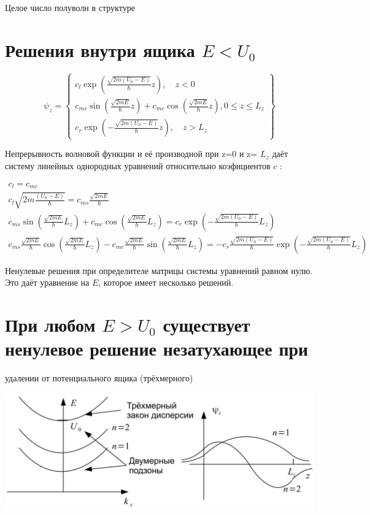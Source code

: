 \documentclass[10pt]{article}
\begin{document}
Целое число полуволн в структуре

\section{Решения внутри ящика $E<U_{0}$}
$$
\psi_{z}=\left\{\begin{array}{c}
c_{l} \exp \left(\frac{\sqrt{2 m\left(U_{0}-E\right)}}{\hbar} z\right), \quad z<0 \\
c_{m s} \sin \left(\frac{\sqrt{2 m E}}{\hbar} z\right)+c_{m c} \cos \left(\frac{\sqrt{2 m E}}{\hbar} z\right), 0 \leq z \leq L_{z} \\
c_{r} \exp \left(-\frac{\sqrt{2 m\left(U_{0}-E\right)}}{\hbar} z\right), \quad z>L_{z}
\end{array}\right\}
$$

Непрерывность волновой функции и её производной при z=0 и z= $L_{z}$ даёт систему линейных однородных уравнений относительно коэфициентов $c$ :

$$
\begin{gathered}
c_{l}=c_{m c} \\
c_{l} \sqrt{2 m \frac{\left(U_{0}-E\right)}{\hbar}}=c_{m s} \frac{\sqrt{2 m E}}{\hbar} \\
c_{m s} \sin \left(\frac{\sqrt{2 m E}}{\hbar} L_{z}\right)+c_{m c} \cos \left(\frac{\sqrt{2 m E}}{\hbar} L_{z}\right)=c_{r} \exp \left(-\frac{\sqrt{2 m\left(U_{0}-E\right)}}{\hbar} L_{z}\right) \\
c_{m s} \frac{\sqrt{2 m E}}{\hbar} \cos \left(\frac{\sqrt{2 m E}}{\hbar} L_{z}\right)-c_{m c} \frac{\sqrt{2 m E}}{\hbar} \sin \left(\frac{\sqrt{2 m E}}{\hbar} L_{z}\right)=-c_{r} \frac{\sqrt{2 m\left(U_{0}-E\right)}}{\hbar} \exp \left(-\frac{\sqrt{2 m\left(U_{0}-E\right)}}{\hbar} L_{z}\right)
\end{gathered}
$$

Ненулевые решения при определителе матрицы системы уравнений равном нулю. Это даёт уравнение на $E$, которое имеет несколько решений.

\section{При любом $E>U_{0}$ существует ненулевое решение незатухающее при}
 удалении от потенциального ящика (трёхмерного)\begin{center}
\includegraphics[max width=\textwidth]{2023_05_21_66a3dfca5be088b7d6b7g-07}
\end{center}
\end{document}
